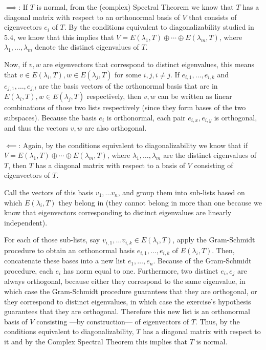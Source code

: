 \begin{solution}

    $\implies$: If $T$ is normal, from the (complex) Spectral Theorem we know that $T$ has a diagonal matrix with respect to an orthonormal basis of $V$ that consists of eigenvectors $e_i$ of $T$. By the conditions equivalent to diagonalizability studied in $5.4$, we know that this implies that $V = E(\lambda_1, T) \oplus \cdots \oplus E(\lambda_m, T)$,
    where $\lambda_1, \ldots, \lambda_m$ denote the distinct eigenvalues of $T$. 
    
    Now, if $v, w$ are eigenvectors that correspond to distinct eigenvalues, this means that $v \in E(\lambda_i, T), w \in E(\lambda_j, T)$ for some $i, j, i \neq j$. If $e_{i,1}, \ldots, e_{i, k}$ and $e_{j, 1}, \ldots, e_{j, l}$ are the basis vectors of the orthonormal basis that are in  $E(\lambda_i, T), w \in E(\lambda_j, T)$ respectively, then $v, w$ can be written as linear combinations  of those two lists respectively (since they form bases of the two subspaces). Because the basis $e_i$ is orthonormal, each pair $e_{i, x}, e_{i, y}$ is orthogonal, and thus the vectors $v, w$ are also orthogonal.

    $\impliedby$: Again, by the conditions equivalent to diagonalizability we know that if $V = E(\lambda_1, T) \oplus \cdots \oplus E(\lambda_m, T)$, where $\lambda_1, \ldots, \lambda_m$ are the distinct eigenvalues of $T$, then $T$ has a diagonal matrix with respect to a basis of $V$ consisting of eigenvectors of $T$. 
    
    Call the vectors of this basis $v_1, \ldots v_n$, and group them into sub-lists based on which $E(\lambda_i, T)$ they belong in (they cannot belong in more than one because we know that eigenvectors corresponding to distinct eigenvalues are linearly independent).

    For each of those sub-lists, say $v_{i, 1}, \ldots v_{i, k} \in E(\lambda_i, T)$, apply the Gram-Schmidt procedure to obtain an orthonormal basis $e_{i, 1}, \ldots, e_{i, k}$ of $E(\lambda_i, T)$. Then, concatenate these bases into a new list $e_1, \ldots, e_n$. Because of the Gram-Schmidt procedure, each $e_i$ has norm equal to one. Furthermore, two distinct $e_i, e_j$ are always orthogonal, because either they correspond to the same eigenvalue, in which case the Gram-Schmidt procedure guarantees that they are orthogonal, or they correspond to distinct eigenvalues, in which case the exercise's hypothesis guarantees that they are orthogonal. Therefore this new list is an orthonormal basis of $V$ consisting ---by construction--- of eigenvectors of $T$. Thus, by the conditions equivalent to diagonalizability, $T$ has a diagonal matrix with respect to it and by the Complex Spectral Theorem this implies that $T$ is normal.
    
\end{solution}

